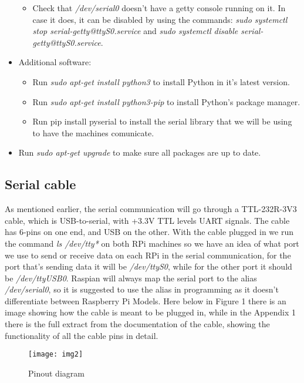 \documentclass[a4paper,11pt]{scrartcl}
\begin{document}
\begin{itemize}
\begin{itemize}
        \item Check that \textit{/dev/serial0} doesn't have a getty console running on it. In case it does, it can be disabled by using the commands: \textit{sudo systemctl stop serial-getty@ttyS0.service} and \textit{sudo systemctl disable serial-getty@ttyS0.service}.
    \end{itemize}
    \item Additional software:
    \begin{itemize}
        \item Run \textit{sudo apt-get install python3} to install Python in it's latest version.
        \item Run \textit{sudo apt-get install python3-pip} to install Python's package manager.
        \item Run {pip install pyserial} to install the serial library that we will be using to have the machines comunicate.
    \end{itemize}
    \item Run \textit{sudo apt-get upgrade} to make sure all packages are up to date.
\end{itemize}

\subsection{Serial cable}
As mentioned earlier, the serial communication will go through a TTL-232R-3V3 cable, which is USB-to-serial, with +3.3V TTL levels UART signals. The cable has 6-pins on one end, and USB on the other.
With the cable plugged in we run the command \textit{ls /dev/tty*} on both RPi machines so we have an idea of what port we use to send or receive data on each RPi in the serial communication, for the port that's sending data it will be \textit{/dev/ttyS0}, while for the other port it should be \textit{/dev/ttyUSB0}. Raspian will always map the serial port to the alias \textit{/dev/serial0}, so it is suggested to use the alias in programming as it doesn't differentiate between Raspberry Pi Models. Here below in Figure 1 there is an image showing how the cable is meant to be plugged in, while in the Appendix 1 there is the full extract from the documentation of the cable, showing the functionality of all the cable pins in detail.

\begin{figure}[h!]
    \centering 
    \texttt{[image: img2]}
    \caption{Pinout diagram}
    \label{fig:figure1}
\end{figure}
\end{document}
